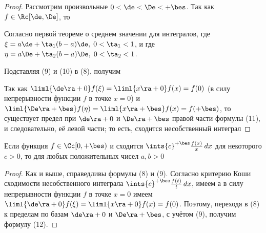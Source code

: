 \documentclass[a4paper]{article}
\begin{document}
\begin{proof}
Рассмотрим произвольные $0<\de<\De<+\bes$. Так как
$f\in\Rc[\de,\De]$, то 

Согласно первой теореме о среднем значении для интегралов,
 где $\xi =
a\de+\ta_1(b-a)\de, \; 0<\ta_1<1$, и  где $\eta = a\De+\ta_2(b-a)\De, \; 0<\ta_2<1$.

Подставляя (9) и (10) в (8), получим 

Так как $\liml{\de\ra+0} f(\xi) = \liml{x\ra+0} f(x) = f(0)$ (в силу
непрерывности функции $f$ в точке $x=0$) и $\liml{\De\ra+\bes}
f(\eta) = \liml{x\ra+\bes} f(x) = f(+\bes)$, то существует предел
при $\de\ra+0$ и $\De\ra+\bes$ правой части формулы (11), и
следовательно, её левой части; то есть, сходится несобственный
интеграл 
\end{proof}

\begin{theorem}
Если функция $f\in\Cc[0,+\bes)$ и сходится $\ints{c}^{+\bes}
\frac{f(x)}x\,dx$ для некоторого $c>0$, то для любых положительных
чисел $a,b>0$ 
\end{theorem}

\begin{proof}
Как и выше, справедливы формулы (8) и (9). Согласно критерию Коши
сходимости несобственного интеграла $\ints{c}^{+\bes}
\frac{f(t)}t\,dx$, имеем  а в силу непрерывности функции $f$ в точке
$x=0$ имеем $\liml{\de\ra+0} f(\xi) = \liml{x\ra+0} f(x) = f(0)$.
Поэтому, переходя в (8) к пределам по базам $\de\ra+0$ и
$\De\ra+\bes$, с учётом (9), получим формулу (12).
\end{proof}
\end{document}
